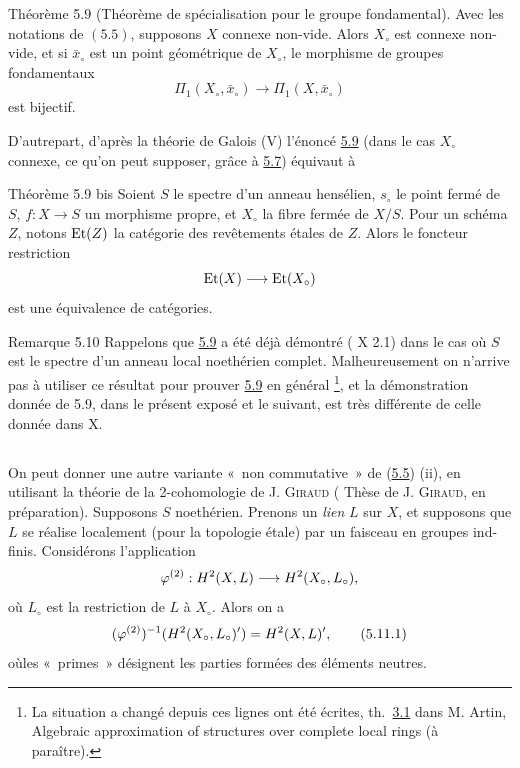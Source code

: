 \documentclass[10pt]{../fichiers-configuration-latex/smfart}
\begin{document}
\begin{enonce*}{Théorème 5.9}
(Théorème de spécialisation pour le groupe fondamental). Avec les
  notations de $(5.5)$, supposons $X$ connexe non-vide. Alors
  $X_{\circ}$ est connexe non-vide, et si $\bar{x}_{\circ}$ est un
  point géométrique de $X_{\circ}$, le morphisme de groupes
  fondamentaux
$$
\Pi_1(X_{\circ},\bar{x}_{\circ})\longrightarrow
\Pi_1(X,\bar{x}_{\circ})
$$
est bijectif.
\end{enonce*}

D'autre\pageoriginale part, d'après la théorie de Galois (\SGA V)
l'énoncé \hyperref[XII.thm5.9]{5.9} (dans le cas $X_{\circ}$ connexe, ce qu'on peut supposer,
grâce à \hyperref[XII.cor5.7]{5.7}) équivaut à

\begin{enonce*}{Théorème 5.9 bis}
Soient $S$ le spectre d'un anneau hensélien, $s_{\circ}$ le point
fermé de $S$, $f:X\rightarrow S$ un morphisme propre, et $X_{\circ}$
la fibre fermée de $X/S$. Pour un schéma $Z$, notons $\operatorname{Et}(Z)$ la
catégorie des revêtements étales de $Z$. Alors le foncteur restriction
$$
\operatorname{Et}(X)\longrightarrow \operatorname{Et}(X_{\circ})
$$
est une équivalence de catégories.
\end{enonce*}

\begin{enonce*}[remark]{Remarque 5.10}
Rappelons que \hyperref[XII.thm5.9]{5.9} a été déjà démontré ( X 2.1) dans le cas où
$S$ est le spectre d'un anneau local noethérien
complet. Malheureusement on n'arrive pas à utiliser ce résultat pour
prouver \hyperref[XII.thm5.9]{5.9} en général \footnote[1]{La situation a changé depuis ces
  lignes ont été écrites, \cf th.~\hyperref[XII.prop3.1]{3.1} dans M. Artin, Algebraic
  approximation of structures over complete local rings (à
  paraître).}, et la démonstration donnée de 5.9, dans le présent
exposé et le suivant, est très différente de celle donnée dans  X.
\end{enonce*}

\setcounter{subsection}{10}
\subsection{}
On peut donner une autre variante « non commutative »  de (\hyperref[XII.cor5.5]{5.5})
(ii), en utilisant la théorie de la 2-cohomologie de J. \textsc{Giraud} (\cf
Thèse de J. \textsc{Giraud}, en préparation). Supposons $S$ noethérien. Prenons
un \emph{lien} $L$ sur $X$, et supposons que $L$ se réalise localement
(pour la topologie étale) par un faisceau en groupes
ind-finis. Considérons l'application
$$
\varphi^{(2)}:H^2(X,L)\longrightarrow H^2(X_{\circ},L_{\circ}){},
$$
où $L_{\circ}$ est la restriction de $L$ à $X_{\circ}$. Alors on a
\begin{equation*}
(\varphi^{(2)})^{-1}(H^2(X_{\circ},L_{\circ})')=H^2(X,L)'{},\tag{5.11.1}
\end{equation*}
où\pageoriginale les « primes »  désignent les parties formées des
éléments neutres.
\end{document}

